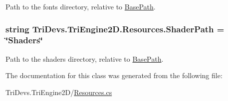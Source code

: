Path to the fonts directory, relative to \hyperlink{class_tri_devs_1_1_tri_engine2_d_1_1_resources_aa82e4dd3095618655c81abefb5c407fe}{Base\-Path}. 

\hypertarget{class_tri_devs_1_1_tri_engine2_d_1_1_resources_ae1076be4f324014f90d33f5b1ac49625}{
\subsubsection[{Shader\-Path}]{\setlength{\rightskip}{0pt plus 5cm}string Tri\-Devs.\-Tri\-Engine2\-D.\-Resources.\-Shader\-Path = \char`\"{}Shaders\char`\"{}\hspace{0.3cm}{\ttfamily [static]}}}\label{class_tri_devs_1_1_tri_engine2_d_1_1_resources_ae1076be4f324014f90d33f5b1ac49625}


Path to the shaders directory, relative to \hyperlink{class_tri_devs_1_1_tri_engine2_d_1_1_resources_aa82e4dd3095618655c81abefb5c407fe}{Base\-Path}. 



The documentation for this class was generated from the following file\-:\begin{DoxyCompactItemize}
\item 
Tri\-Devs.\-Tri\-Engine2\-D/\hyperlink{_resources_8cs}{Resources.\-cs}\end{DoxyCompactItemize}

